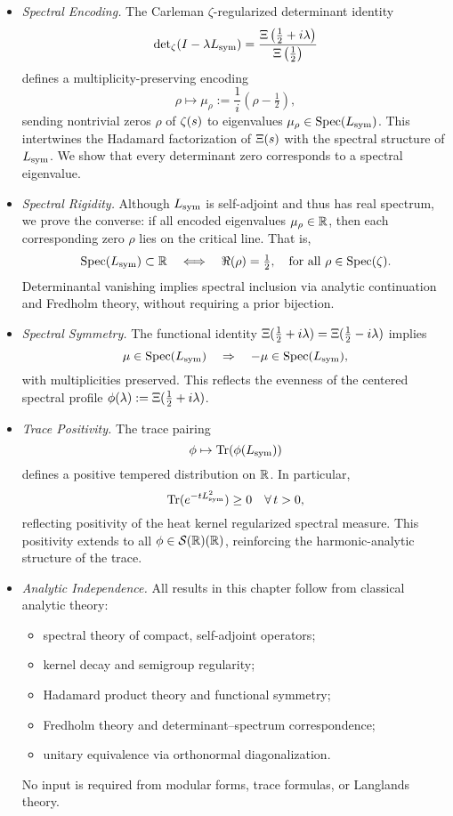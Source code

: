 \begin{itemize}
  \item \textit{Spectral Encoding.}  
  The Carleman \(\zeta\)-regularized determinant identity
  \[
  \det\nolimits_{\zeta}(I - \lambda L_{\mathrm{sym}})
  = \frac{\Xi\left(\tfrac{1}{2} + i\lambda\right)}{\Xi\left(\tfrac{1}{2}\right)}
  \]
  defines a multiplicity-preserving encoding
  \[
  \rho \mapsto \mu_\rho := \frac{1}{i}(\rho - \tfrac{1}{2}),
  \]
  sending nontrivial zeros \( \rho \) of \( \zeta(s) \) to eigenvalues \( \mu_\rho \in \operatorname{Spec}(L_{\mathrm{sym}}) \). This intertwines the Hadamard factorization of \( \Xi(s) \) with the spectral structure of \( L_{\mathrm{sym}} \). We show that every determinant zero corresponds to a spectral eigenvalue.

  \item \textit{Spectral Rigidity.}  
  Although \( L_{\mathrm{sym}} \) is self-adjoint and thus has real spectrum, we prove the converse: if all encoded eigenvalues \( \mu_\rho \in \mathbb{R} \), then each corresponding zero \( \rho \) lies on the critical line. That is,
  \[
  \operatorname{Spec}(L_{\mathrm{sym}}) \subset \mathbb{R}
  \quad \Longleftrightarrow \quad
  \Re(\rho) = \tfrac{1}{2}, \quad \text{for all } \rho \in \operatorname{Spec}(\zeta).
  \]
  Determinantal vanishing implies spectral inclusion via analytic continuation and Fredholm theory, without requiring a prior bijection.

  \item \textit{Spectral Symmetry.}  
  The functional identity \( \Xi(\tfrac{1}{2} + i\lambda) = \Xi(\tfrac{1}{2} - i\lambda) \) implies
  \[
  \mu \in \operatorname{Spec}(L_{\mathrm{sym}}) \quad \Rightarrow \quad -\mu \in \operatorname{Spec}(L_{\mathrm{sym}}),
  \]
  with multiplicities preserved. This reflects the evenness of the centered spectral profile \( \phi(\lambda) := \Xi(\tfrac{1}{2} + i\lambda) \).

  \item \textit{Trace Positivity.}  
  The trace pairing
  \[
  \phi \mapsto \operatorname{Tr}(\phi(L_{\mathrm{sym}}))
  \]
  defines a positive tempered distribution on \( \mathbb{R} \). In particular,
  \[
  \operatorname{Tr}(e^{-tL_{\mathrm{sym}}^2}) \ge 0 \quad \forall\, t > 0,
  \]
  reflecting positivity of the heat kernel regularized spectral measure. This positivity extends to all \( \phi \in \mathcal{S}(\mathbb{R})(\mathbb{R}) \), reinforcing the harmonic-analytic structure of the trace.

  \item \textit{Analytic Independence.}  
  All results in this chapter follow from classical analytic theory:
  \begin{itemize}
    \item spectral theory of compact, self-adjoint operators;
    \item kernel decay and semigroup regularity;
    \item Hadamard product theory and functional symmetry;
    \item Fredholm theory and determinant–spectrum correspondence;
    \item unitary equivalence via orthonormal diagonalization.
  \end{itemize}
  No input is required from modular forms, trace formulas, or Langlands theory.
\end{itemize}
